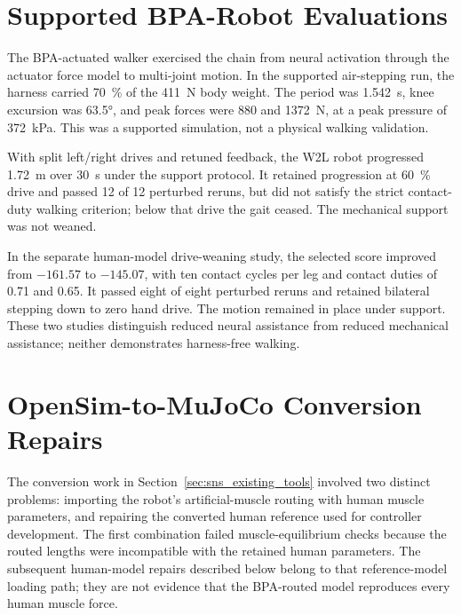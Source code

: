 \section{Supported BPA-Robot Evaluations}\label{sec:sns_controller_comparison}

The BPA-actuated walker exercised the chain from neural activation through the actuator force model to multi-joint motion. In the supported air-stepping run, the harness carried \qty{70}{\percent} of the \qty{411}{\newton} body weight. The period was \qty{1.542}{\second}, knee excursion was \ang{63.5}, and peak forces were \qty{880}{} and \qty{1372}{\newton}, at a peak pressure of \qty{372}{\kPa}. This was a supported simulation, not a physical walking validation.

With split left/right drives and retuned feedback, the W2L robot progressed \qty{1.72}{\meter} over \qty{30}{\second} under the support protocol. It retained progression at \qty{60}{\percent} drive and passed 12 of 12 perturbed reruns, but did not satisfy the strict contact-duty walking criterion; below that drive the gait ceased. The mechanical support was not weaned.

In the separate human-model drive-weaning study, the selected score improved from $-161.57$ to $-145.07$, with ten contact cycles per leg and contact duties of 0.71 and 0.65. It passed eight of eight perturbed reruns and retained bilateral stepping down to zero hand drive. The motion remained in place under support. These two studies distinguish reduced neural assistance from reduced mechanical assistance; neither demonstrates harness-free walking.


\section{OpenSim-to-MuJoCo Conversion Repairs}\label{sec:app_conversion_repairs}

The conversion work in Section~\ref{sec:sns_existing_tools} involved two distinct problems: importing the robot's artificial-muscle routing with human muscle parameters, and repairing the converted human reference used for controller development. The first combination failed muscle-equilibrium checks because the routed lengths were incompatible with the retained human parameters. The subsequent human-model repairs described below belong to that reference-model loading path; they are not evidence that the BPA-routed model reproduces every human muscle force.

